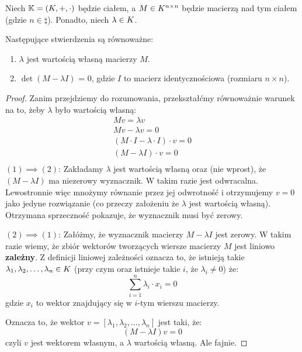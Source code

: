 \begin{theorem}
Niech \(\mathbb{K} = (K, +, \cdot)\) będzie ciałem, a \(M \in K^{n \times n}\) będzie macierzą nad tym ciałem (gdzie \(n \in \natural\)). Ponadto, niech \(\lambda \in K\).  

Następujące stwierdzenia są równoważne: 
\begin{enumerate}
    \item \(\lambda\) jest wartością własną macierzy \(M\).
    \item \(\det{(M - \lambda I)}\) = 0, gdzie \(I\) to macierz identycznościowa (rozmiaru \(n \times n\)). 
\end{enumerate}
\end{theorem}
\begin{proof}
Zanim przejdziemy do rozumowania, przekształćmy równoważnie warunek na to, żeby \(\lambda\) było wartością własną:
\begin{align*}
        Mv = \lambda v \\
        Mv - \lambda v = 0 \\ 
        (M \cdot I - \lambda \cdot I) \cdot v = 0\\
        (M - \lambda I) \cdot v = 0\\
\end{align*}
\( (1) \implies (2) \):
Zakładamy \(\lambda\) jest wartością własną oraz (nie wprost), że \((M - \lambda I)\) ma niezerowy wyznacznik. W takim razie jest odwracalna. Lewostronnie więc mnożymy równanie przez jej odwrotność i otrzymujemy \(v = 0\) jako jedyne rozwiązanie (co przeczy założeniu że \(\lambda\) jest wartością własną). Otrzymana sprzeczność pokazuje, że wyznacznik musi być zerowy.

\( (2) \implies (1) \):
Załóżmy, że wyznacznik macierzy \(M - \lambda I\) jest zerowy. W takim razie wiemy, że zbiór wektorów tworzących wiersze macierzy \(M\) jest liniowo \textbf{zależny}. Z definicji liniowej zależności oznacza to, że istnieją takie \(\lambda_1, \lambda_2, \dots, \lambda_n \in K\) (przy czym oraz istnieje takie \(i\), że \(\lambda_i \not = 0\)) że:
\[
    \sum_{i=1}^{n} \lambda_i \cdot x_i = 0
\]
gdzie \(x_i\) to wektor znajdujący się w \(i\)-tym wierszu macierzy.

Oznacza to, że wektor \(v = [\lambda_1, \lambda_2, \dots, \lambda_n]\) jest taki, że:
\[
    (M - \lambda I ) v = 0
\]
czyli \(v\) jest wektorem własnym, a \(\lambda\) wartością własną. Ale fajnie.

\end{proof}

